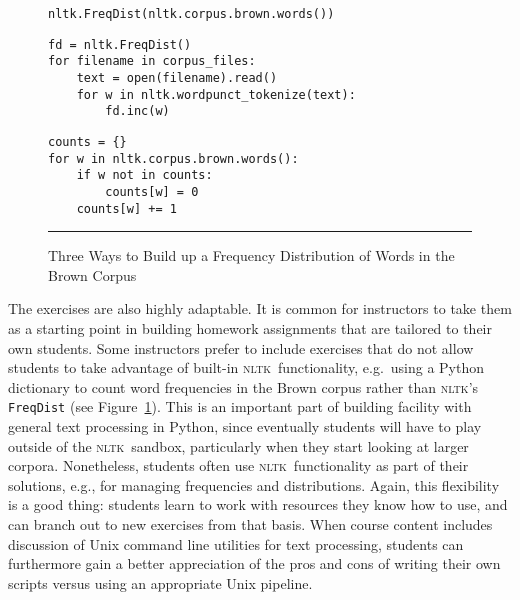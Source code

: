 \documentclass[11pt]{article}
\newcommand{\NLTK}{\textsc{nltk}}
\newcommand{\code}[1]{\texttt{\small #1}}
\begin{document}



\begin{figure}
{\footnotesize
\begin{verbatim}
nltk.FreqDist(nltk.corpus.brown.words())
\end{verbatim}
\medskip

\begin{verbatim}
fd = nltk.FreqDist()
for filename in corpus_files:
    text = open(filename).read()
    for w in nltk.wordpunct_tokenize(text):
        fd.inc(w)
\end{verbatim}
\medskip

\begin{verbatim}
counts = {}
for w in nltk.corpus.brown.words():
    if w not in counts:
        counts[w] = 0
    counts[w] += 1
\end{verbatim}
}
\caption{Three Ways to Build up a Frequency Distribution of Words in the Brown Corpus}
\label{fig:freqdist}
\vspace*{1ex}
\hrule
\end{figure}

The exercises are also highly adaptable. It is common for instructors
to take them as a starting point in building homework assignments that
are tailored to their own students.  Some instructors prefer to
include exercises that do not allow students to take advantage of
built-in \NLTK\ functionality, e.g.\  using a Python dictionary to
count word frequencies in the Brown corpus rather than \NLTK 's
\code{FreqDist} (see Figure~\ref{fig:freqdist}).  This is an important
part of building facility with general text processing in Python,
since eventually students will have to play outside of the \NLTK\
sandbox, particularly when they start looking at larger
corpora. Nonetheless, students often use \NLTK\ functionality as part
of their solutions, e.g., for managing frequencies and
distributions. Again, this flexibility is a good thing: students learn
to work with resources they know how to use, and can branch out to new
exercises from that basis. When course content includes discussion of
Unix command line utilities for text processing, students can
furthermore gain a better appreciation of the pros and cons of writing
their own scripts versus using an appropriate Unix pipeline.
\end{document}
